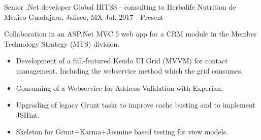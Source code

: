 


\begin{cventries}
	
	
	\cventry
	{Senior .Net developer} %
	{Global HITSS - consulting to Herbalife Nutrition de Mexico} %
	{Guadajara, Jalisco, MX} %
	{Jul. 2017 - Present} %
	{ %
		\begin{cvitems}
			\item {Collaboration in an ASP.Net MVC 5 web app for a CRM module in the Member Technology Strategy (MTS) division.}
			\begin{itemize}
				\item {Development of a full-featured Kendo UI Grid (MVVM) for contact management. Including the webservice method which the grid consumes.}
				\item {Consuming of a Webservice for Address Validation with Experian. }
				\item {Upgrading of legacy Grunt tasks to improve cache busting and to implement JSHint.}
				\item {Skeleton for Grunt+Karma+Jasmine based testing for view models.}
			\end{itemize}
		\end{cvitems}
	}
	



\end{cventries}
